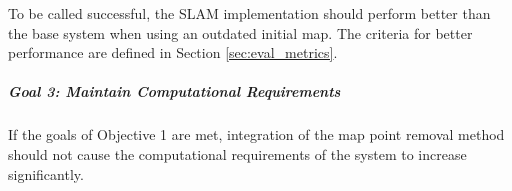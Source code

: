 To be called successful, the SLAM implementation should perform better than the base system when using an outdated initial map. The criteria for better performance are defined in Section \ref{sec:eval_metrics}.

\subparagraph{Goal 3: Maintain Computational Requirements}

If the goals of Objective 1 are met, integration of the map point removal method should not cause the computational requirements of the system to increase significantly.







